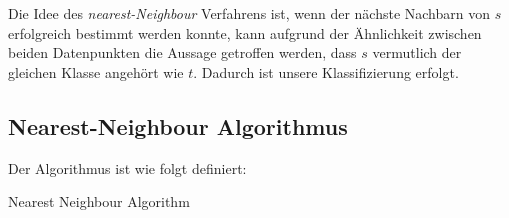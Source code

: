 \documentclass[fontsize=11pt]{scrartcl}
\begin{document}
                Die Idee des \emph{nearest-Neighbour} Verfahrens ist, wenn der nächste Nachbarn von $s$ erfolgreich bestimmt werden konnte, kann aufgrund der Ähnlichkeit zwischen beiden Datenpunkten die Aussage getroffen werden, dass $s$ vermutlich der gleichen Klasse angehört wie $t$. Dadurch ist unsere Klassifizierung erfolgt.\par
               
                        
            \subsection{Nearest-Neighbour Algorithmus}
             Der Algorithmus ist wie folgt definiert:\par
                            \begin{algorithm}[H]
                                    {
                                        \KwRet{-}\;
                                    }
                                \caption{Nearest Neighbour Algorithm}
                            \end{algorithm}
				
\end{document}
